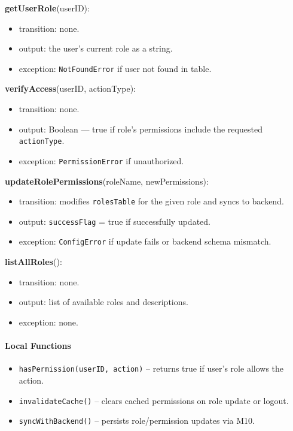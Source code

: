 \documentclass[12pt, titlepage]{article}
\begin{document}
\noindent \textbf{getUserRole}(userID):
\begin{itemize}
  \item transition: none.
  \item output: the user’s current role as a string.
  \item exception: \texttt{NotFoundError} if user not found in table.
\end{itemize}

\noindent \textbf{verifyAccess}(userID, actionType):
\begin{itemize}
  \item transition: none.
  \item output: Boolean — true if role’s permissions include the requested \texttt{actionType}.
  \item exception: \texttt{PermissionError} if unauthorized.
\end{itemize}

\noindent \textbf{updateRolePermissions}(roleName, newPermissions):
\begin{itemize}
  \item transition: modifies \texttt{rolesTable} for the given role and syncs to backend.
  \item output: \texttt{successFlag} = true if successfully updated.
  \item exception: \texttt{ConfigError} if update fails or backend schema mismatch.
\end{itemize}

\noindent \textbf{listAllRoles}():
\begin{itemize}
  \item transition: none.
  \item output: list of available roles and descriptions.
  \item exception: none.
\end{itemize}

\paragraph{Local Functions}
\begin{itemize}
  \item \texttt{hasPermission(userID, action)} – returns true if user’s role allows the action.
  \item \texttt{invalidateCache()} – clears cached permissions on role update or logout.
  \item \texttt{syncWithBackend()} – persists role/permission updates via M10.
\end{itemize}
\end{document}
